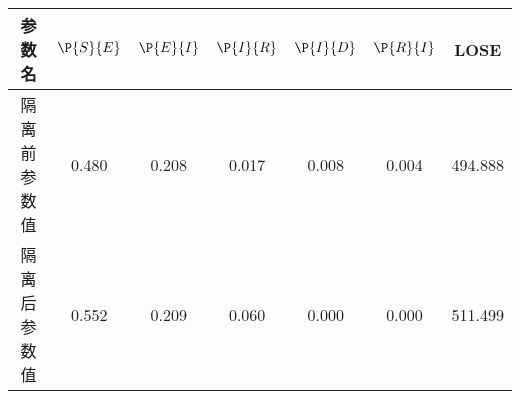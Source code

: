 \begin{tabular}{ccccccc}
\hline
参数名&$\P{S}{E}$&$\P{E}{I}$&$\P{I}{R}$&$\P{I}{D}$&$\P{R}{I}$&LOSE\\
\hline
隔离前参数值&0.480&0.208&0.017&0.008&0.004&494.888\\
隔离后参数值&0.552&0.209&0.060&0.000&0.000&511.499\\
\hline
\end{tabular}